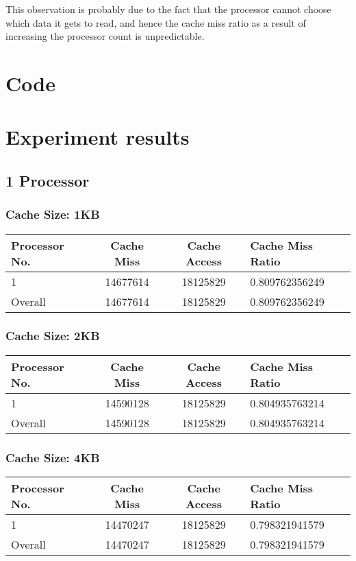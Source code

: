 \documentclass[]{article}
\begin{document}
This observation is probably due to the fact that the processor cannot choose which data it gets to read, and hence the cache miss ratio as a result of increasing the processor count is unpredictable.\\

\pagebreak
\appendix
\label{sec:appendix_start}
\section{Code}


\section{Experiment results}
\subsection{1 Processor}
\subsubsection{Cache Size: 1KB}
\begin{tabularx}{\textwidth}{ | l | c | c | X | }
\hline
Processor No.    & Cache Miss    & Cache Access  &   Cache Miss Ratio \\
\hline
1    & 14677614  & 18125829    & 0.809762356249 \\
\hline
Overall & 14677614    & 18125829  & 0.809762356249 \\
\hline
\end{tabularx}


\subsubsection{Cache Size: 2KB}
\begin{tabularx}{\textwidth}{ | l | c | c | X | }
\hline
Processor No.    & Cache Miss    & Cache Access  &   Cache Miss Ratio \\
\hline
1    & 14590128  & 18125829    & 0.804935763214 \\
\hline
Overall & 14590128    & 18125829  & 0.804935763214 \\
\hline
\end{tabularx}


\subsubsection{Cache Size: 4KB}
\begin{tabularx}{\textwidth}{ | l | c | c | X | }
\hline
Processor No.    & Cache Miss    & Cache Access  &   Cache Miss Ratio \\
\hline
1    & 14470247  & 18125829    & 0.798321941579 \\
\hline
Overall & 14470247    & 18125829  & 0.798321941579 \\
\hline
\end{tabularx}
\end{document}

